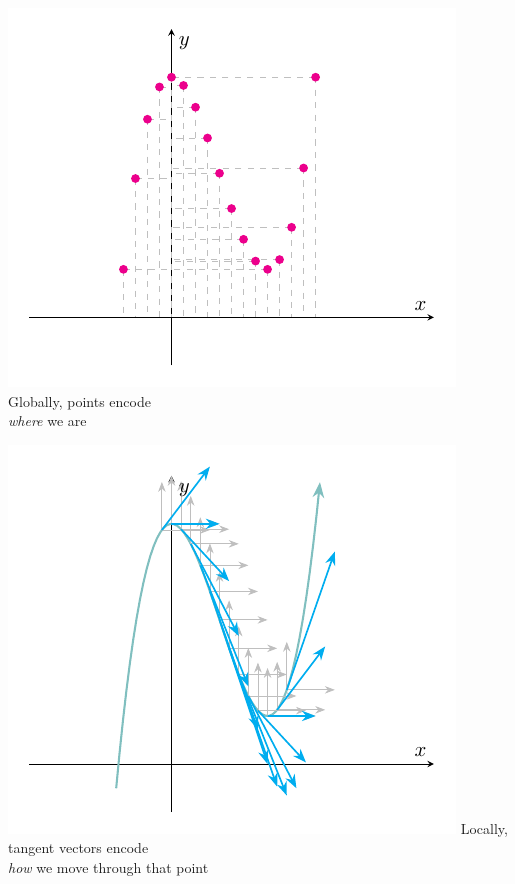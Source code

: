 \documentclass[11pt,openany]{article}
\begin{document}
\begin{center}
\begin{minipage}{.49\textwidth}\centering
	\includegraphics[scale=1]{tangent-space-4-1.pdf}
	Globally, points encode \\\emph{where} we are
\end{minipage}\hfill
\begin{minipage}{.49\textwidth}\centering
	\includegraphics[scale=1]{tangent-space-4-2.pdf}
	Locally, tangent vectors encode\\ \emph{how} we move through that point
\end{minipage}
\end{center}
\end{document}
